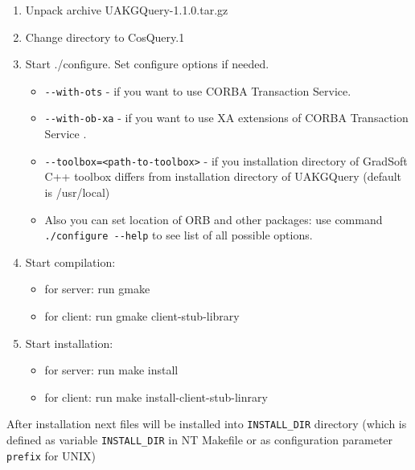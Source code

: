 \documentclass[10pt]{article}
\begin{document}
\begin{enumerate}
 \item Unpack archive UAKGQuery-1.1.0.tar.gz
 \item Change directory to CosQuery.1
 \item Start ./configure. Set configure options if needed.
 \begin{itemize}
   \item \verb|--with-ots| - if you want to use CORBA Transaction Service.
   \item \verb|--with-ob-xa| - if you want to use XA extensions of CORBA Transaction Service .
   \item \verb|--toolbox=<path-to-toolbox>| - if you installation directory of 
       GradSoft C++ toolbox  differs from installation directory of UAKGQuery
       (default is /usr/local)
   \item Also you can set location of ORB and other packages: use command
   \verb|./configure --help| to see list of all possible options.
 \end{itemize}
  
 \item Start compilation:
   \begin{itemize}
     \item for server: run gmake 
     \item for client: run gmake client-stub-library
   \end{itemize}
 \item Start installation:
    \begin{itemize}
      \item for server: run make install
      \item for client: run make install-client-stub-linrary
   \end{itemize}
\end{enumerate}


 After installation next files will be installed into \verb|INSTALL_DIR|
 directory (which is defined as variable \verb|INSTALL_DIR| in NT Makefile 
 or as configuration parameter \verb|prefix| for UNIX)
\end{document}
